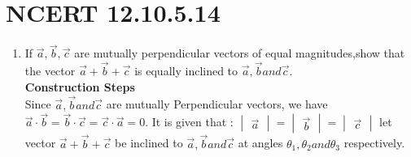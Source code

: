 \documentclass{article}
\newcommand{\mydet}[1]{\ensuremath{\begin{vmatrix}#1\end{vmatrix}}}
\begin{document}
\section*{NCERT 12.10.5.14}
\begin{enumerate}
    \item If $\vec{a},\vec{b},\vec{c}$ are mutually perpendicular vectors of equal magnitudes,show that the vector $\vec{a}+\vec{b}+\vec{c}$ is equally inclined to $\vec{a},\vec{b} and \vec{c}$.\\
    
    \textbf{Construction Steps}\\
    
    Since $\vec{a},\vec{b} and \vec{c}$ are mutually Perpendicular vectors, we have $\vec{a} \cdot \vec{b}=\vec{b} \cdot \vec{c}=\vec{c} \cdot \vec{a}=0$. It is given that : 
    $\mydet{\vec{a}}=\mydet{\vec{b}}=\mydet{\vec{c}}$
    let vector $\vec{a}+\vec{b}+\vec{c}$ be inclined to $\vec{a},\vec{b} and \vec{c}$ at angles $\theta_1,\theta_2 and \theta_3$ respectively.\\
    

\end{enumerate}
\end{document}
